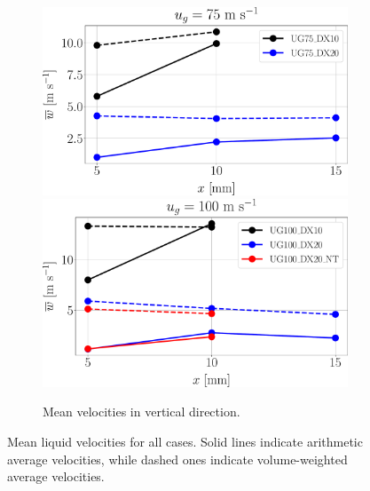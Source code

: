 \begin{figure}[ht]
\begin{subfigure}[b]{1.0\textwidth}
	\flushleft
   \includegraphics[scale=0.225]{./part2_developments/figures_ch5_resolved_JICF/SPRAY_characterization/velocities/ug75_uz_mean}
   \hfill
   \includegraphics[scale=0.225]{./part2_developments/figures_ch5_resolved_JICF/SPRAY_characterization/velocities/ug100_uz_mean}
	\caption{Mean velocities in vertical direction.}
\end{subfigure}

   \caption[Sampled mean liquid velocities for all cases]{Mean liquid velocities for all cases. Solid lines indicate arithmetic average velocities, while dashed ones indicate volume-weighted average velocities.}
\label{fig:jicf_liquid_mean_velocities_with_x}
\end{figure}


